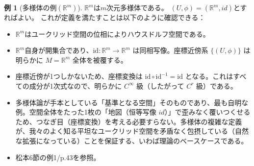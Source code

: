 \documentclass[paper=a4, fontsize=11pt]{jlreq} %
\theoremstyle{definition}
\newtheorem{example}[theorem]{例}
\begin{document}
\begin{example}[多様体の例$(\mathbb{R}^{m})$]
    $\mathbb{R}^{m}$は$m$次元多様体である。
    $(U, \phi) = (\mathbb{R}^{m}, id)$とすればよい。
    これが定義を満たすことは以下のように確認できる：
    \begin{itemize}
        \item[(1)] $\mathbb{R}^m$はユークリッド空間の位相によりハウスドルフ空間である。
        \item[(2)] $\mathbb{R}^m$自身が開集合であり、$\mathrm{id}: \mathbb{R}^m \to \mathbb{R}^m$ は同相写像。座標近傍系 $\{(U, \phi)\}$ は明らかに $M=\mathbb{R}^m$ 全体を被覆する。
        \item[(3)] 座標近傍が1つしかないため、座標変換は $\mathrm{id} \circ \mathrm{id}^{-1} = \mathrm{id}$ となる。これはすべての成分が1次式なので、明らかに $C^\infty$ 級（したがって $C^r$ 級）である。
    \end{itemize}   
    \begin{itemize}
        \item[\textbf{Insight:}] 多様体論が手本としている「基準となる空間」そのものであり、最も自明な例。空間全体をたった1枚の「地図（恒等写像 $id$）」で歪みなく覆いつくせるため、つなぎ目（座標変換）を考える必要すらない。多様体の複雑な定義が、我々のよく知る平坦なユークリッド空間を矛盾なく包摂している（自然な拡張になっている）ことを保証する、いわば理論のベースケースである。
        \item[\textbf{Link:}] 松本6節の例1/p.43を参照。
    \end{itemize}
\end{example}
\end{document}
